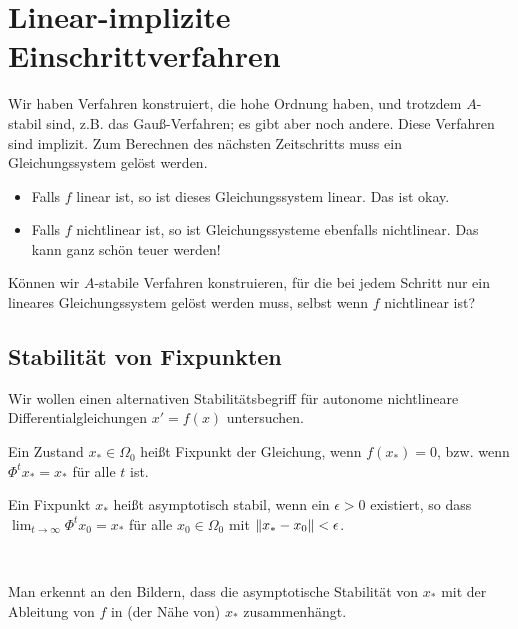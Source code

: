 \section{Linear-implizite Einschrittverfahren}

Wir haben Verfahren konstruiert, die hohe Ordnung haben, und trotzdem $A$-stabil sind, z.B. das Gauß-Verfahren; es gibt aber noch andere.
Diese Verfahren sind implizit. Zum Berechnen des nächsten Zeitschritts muss ein Gleichungssystem gelöst werden.
\begin{itemize}
	\item Falls $f$ linear ist, so ist dieses Gleichungssystem linear. Das ist okay.
	\item Falls $f$ nichtlinear ist, so ist Gleichungssysteme ebenfalls nichtlinear. Das kann ganz schön teuer werden!
\end{itemize}
Können wir $A$-stabile Verfahren konstruieren, für die bei jedem Schritt nur ein lineares Gleichungssystem gelöst werden muss, selbst wenn $f$ nichtlinear ist?

\subsection{Stabilität von Fixpunkten}

Wir wollen einen alternativen Stabilitätsbegriff für autonome
nichtlineare Differentialgleichungen $x'=f(x)$ untersuchen.

\begin{definition}
	Ein Zustand $x_* \in \Omega_0$ heißt Fixpunkt der Gleichung, wenn $f(x_*)=0$, bzw. wenn $\Phi^tx_* = x_*$ für alle $t$ ist.
\end{definition}
\begin{definition}
	Ein Fixpunkt $x_*$ heißt asymptotisch stabil, wenn ein $\epsilon>0$ existiert, so dass $\lim_{t \to \infty} \Phi^t x_0 = x_*$ für alle $x_0 \in \Omega_0$ mit $\lVert x_* - x_0 \rVert < \epsilon$.
\end{definition}

\begin{bsp} ~
	\begin{center}
		\hspace{0.1\textwidth}%
	\end{center}
	Man erkennt an den Bildern, dass die asymptotische Stabilität von $x_*$ mit der Ableitung von $f$ in (der Nähe von) $x_*$ zusammenhängt. 
\end{bsp}


